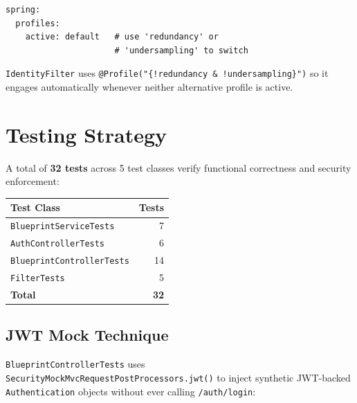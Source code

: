 \documentclass[10pt,a4paper,twocolumn]{article}
\begin{document}
\begin{lstlisting}[style=yamlcode, caption={Profile activation in application.yml}]
spring:
  profiles:
    active: default   # use 'redundancy' or
                      # 'undersampling' to switch
\end{lstlisting}

\begin{note}
\texttt{IdentityFilter} uses \texttt{@Profile("\{!redundancy \&
!undersampling\}")} so it engages automatically whenever neither alternative
profile is active.
\end{note}

\section{Testing Strategy}

A total of \textbf{32 tests} across 5 test classes verify functional
correctness and security enforcement:

\begin{center}
\small
\begin{tabular}{@{}p{3.2cm}r@{}}
\toprule
\textbf{Test Class} & \textbf{Tests} \\
\midrule
\texttt{BlueprintServiceTests}     & 7  \\
\texttt{AuthControllerTests}       & 6  \\
\texttt{BlueprintControllerTests}  & 14 \\
\texttt{FilterTests}               & 5  \\
\midrule
\textbf{Total}                     & \textbf{32} \\
\bottomrule
\end{tabular}
\end{center}

\subsection{JWT Mock Technique}

\texttt{BlueprintControllerTests} uses
\texttt{SecurityMockMvcRequestPostProcessors.jwt()} to inject synthetic
JWT-backed \texttt{Authentication} objects without ever calling
\texttt{/auth/login}:
\end{document}
